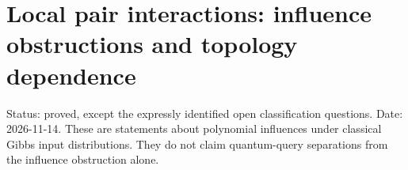 \section{Local pair interactions: influence obstructions and topology
dependence}\label{proof:local_interactions}

Status: proved, except the expressly identified open classification
questions. Date: 2026-11-14. These are statements about polynomial
influences under classical Gibbs input distributions. They do not claim
quantum-query separations from the influence obstruction alone.












